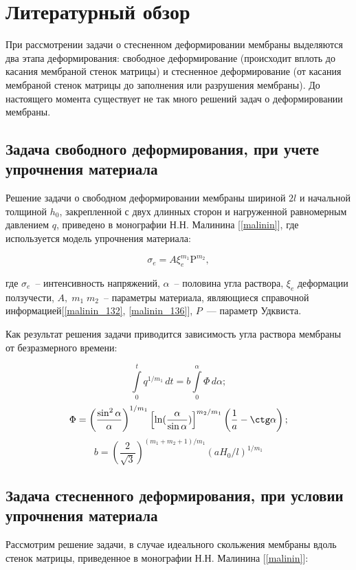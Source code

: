 \section{Литературный обзор}

При рассмотрении задачи о стесненном деформировании мембраны выделяются 
два этапа деформирования: свободное деформирование (происходит вплоть до касания мембраной стенок матрицы) и стесненное деформирование (от касания мембраной стенок матрицы до заполнения или разрушения мембраны). До настоящего момента существует  не так много решений задач о деформировании мембраны.

\subsection{Задача свободного деформирования, при учете упрочнения материала}
Решение задачи о свободном деформировании мембраны шириной $2l$ и начальной толщиной $h_0$, закрепленной с двух длинных сторон и нагруженной равномерным давлением $q$, приведено в монографии Н.Н. Малинина [\ref{malinin}], где используется модель упрочнения материала:

\begin{equation}
	\sigma_e = A\xi_e^{m_1}\text{P}^{m_2},
\end{equation}

где $\sigma_e$~-- интенсивность напряжений, $\alpha$~-- половина угла раствора, $\xi_e $ деформации ползучести, $A, \; m_1\; m_2$~-- параметры 
материала, являющиеся справочной информацией[\ref{malinin_132}, \ref{malinin_136}], $P$~--- параметр Удквиста. 

Как результат решения задачи приводится зависимость угла раствора мембраны от безразмерного времени:

	$$\int\limits^t_0q^{1/m_1}\,dt = b\int\limits_0^{\alpha}\Phi\,d\alpha;$$
	$$\Phi  = \left(\dfrac{\sin^2\alpha}{\alpha}\right)^{1/m_1}\left[\ln(\dfrac{\alpha}{\sin\alpha})\right]^{m_2/m_1}
	\left(\dfrac{1}{a} - \ctg \alpha \right);$$
	$$b = \left(\dfrac{2}{\sqrt 3}\right)^{(m_1+m_2+1)/m_1}(aH_0/l)^{1/m_1}$$

\subsection{Задача стесненного деформирования, при условии упрочнения материала}
Рассмотрим решение задачи, в случае идеального скольжения мембраны вдоль стенок матрицы, приведенное в 
монографии Н.Н. Малинина [\ref{malinin}]:

